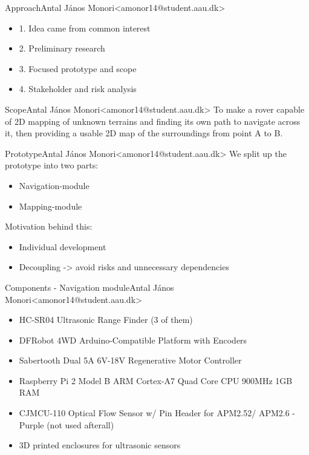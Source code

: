 \begin{frame}{Approach}{Antal János Monori\newline<amonor14@student.aau.dk>}
	\begin{itemize}
		\item 1. Idea came from common interest
		\item 2. Preliminary research
		\item 3. Focused prototype and scope
		\item 4. Stakeholder and risk analysis
	\end{itemize}
\end{frame}

\begin{frame}{Scope}{Antal János Monori\newline<amonor14@student.aau.dk>}
	To make a rover capable of 2D mapping of unknown terrains and finding its own path to navigate across it, then providing a usable 2D map of the surroundings from point A to B.
\end{frame}

\begin{frame}{Prototype}{Antal János Monori\newline<amonor14@student.aau.dk>}
	We split up the prototype into two parts:
	\begin{itemize}
		\item Navigation-module
		\item Mapping-module
	\end{itemize}
	Motivation behind this:
	\begin{itemize}
		\item Individual development
		\item Decoupling -> avoid risks and unnecessary dependencies
	\end{itemize}
\end{frame}

\begin{frame}{Components - Navigation module}{Antal János Monori\newline<amonor14@student.aau.dk>}
	\begin{itemize}
		\item HC-SR04 Ultrasonic Range Finder (3 of them)
		\item DFRobot 4WD Arduino-Compatible Platform with Encoders
		\item Sabertooth Dual 5A 6V-18V Regenerative Motor Controller		
		\item Raspberry Pi 2 Model B ARM Cortex-A7 Quad Core CPU 900MHz 1GB RAM 
		\item CJMCU-110 Optical Flow Sensor w/ Pin Header for APM2.52/ APM2.6 - Purple	(not used afterall)
		\item 3D printed enclosures for ultrasonic sensors
	\end{itemize}
\end{frame}

